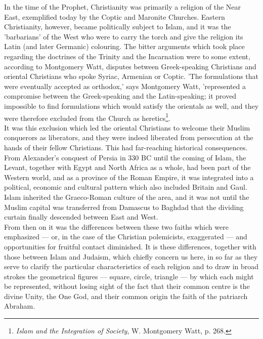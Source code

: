 \documentclass[11pt, b5paper, twoside]{book}
\begin{document}
In the time of the Prophet, Christianity was primarily a religion of the Near East, exemplified today 
by the Coptic and Maronite Churches. Eastern Christianity, however, became politically subject to 
Islam, and it was the 'barbarians' of the West who were to carry the torch and give the religion its 
Latin (and later Germanic) colouring. The bitter arguments which took place regarding the doctrines 
of the Trinity and the Incarnation were to some extent, according to Montgomery Watt, disputes 
between Greek-speaking Christians and oriental Christians who spoke Syriac, Armenian or Coptic. 'The 
formulations that were eventually accepted as orthodox,' says Montgomery Watt, 'represented a 
compromise between the Greek-speaking and the Latin-speaking; it proved impossible to find 
formulations which would satisfy the orientals as well, and they were therefore excluded from the 
Church as heretics\footnote{\emph{Islam and the Integration of Society}, W. Montgomery Watt, p. 268.}. \\

It was this exclusion which led the oriental Christians to welcome their Muslim conquerors as 
liberators, and they were indeed liberated from persecution at the hands of their fellow Christians. 
This had far-reaching historical consequences. From Alexander's conquest of Persia in 330 BC until 
the coming of Islam, the Levant, together with Egypt and North Africa as a whole, had been part of 
the Western world, and as a province of the Roman Empire, it was integrated into a political, 
economic and cultural pattern which also included Britain and Gaul. Islam inherited the Graeco-Roman 
culture of the area, and it was not until the Muslim capital was transferred from Damascus to Baghdad 
that the dividing curtain finally descended between East and West. \\

From then on it was the differences between these two faiths which were emphasized --- or, in the case 
of the Christian polemicists, exaggerated --- and opportunities for fruitful contact diminished. It is 
these differences, together with those between Islam and Judaism, which chiefly concern us here, in 
so far as they serve to clarify the particular characteristics of each religion and to draw in broad 
strokes the geometrical figures --- square, circle, triangle --- by which each might be represented, 
without losing sight of the fact that their common centre is the divine Unity, the One God, and their 
common origin the faith of the patriarch Abraham. \\
\end{document}
